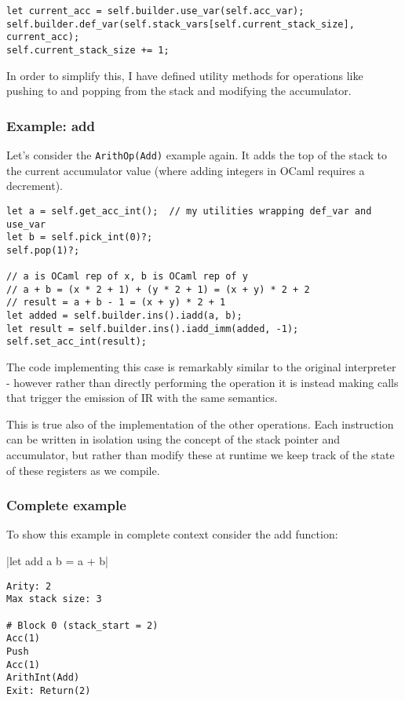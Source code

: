 \begin{verbatim}
let current_acc = self.builder.use_var(self.acc_var);
self.builder.def_var(self.stack_vars[self.current_stack_size], current_acc);
self.current_stack_size += 1;
\end{verbatim}

In order to simplify this, I have defined utility methods for operations like pushing to and
popping from the stack and modifying the accumulator.

\subsubsection{Example: add}

Let's consider the \texttt{ArithOp(Add)} example again. It adds the top of the stack to the current
accumulator value (where adding integers in OCaml requires a decrement).

\begin{verbatim}
let a = self.get_acc_int();  // my utilities wrapping def_var and use_var
let b = self.pick_int(0)?;
self.pop(1)?;

// a is OCaml rep of x, b is OCaml rep of y
// a + b = (x * 2 + 1) + (y * 2 + 1) = (x + y) * 2 + 2
// result = a + b - 1 = (x + y) * 2 + 1
let added = self.builder.ins().iadd(a, b);
let result = self.builder.ins().iadd_imm(added, -1);
self.set_acc_int(result);
\end{verbatim}

The code implementing this case is remarkably similar to the original interpreter - however rather
than directly performing the operation it is instead making calls that trigger the emission of IR
with the same semantics.

This is true also of the implementation of the other operations. Each instruction can be written in
isolation using the concept of the stack pointer and accumulator, but rather than modify these at
runtime we keep track of the state of these registers as we compile.

\subsubsection{Complete example}

To show this example in complete context consider the add function:

|let add a b = a + b|

\begin{verbatim}
Arity: 2
Max stack size: 3

# Block 0 (stack_start = 2)
Acc(1)
Push
Acc(1)
ArithInt(Add)
Exit: Return(2)
\end{verbatim}

